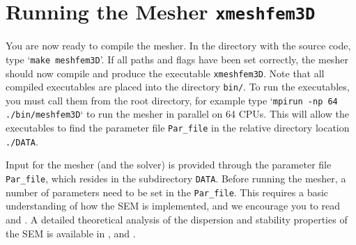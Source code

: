 \documentclass[oneside,english]{book}
\begin{document}
\chapter{\label{cha:Running-the-Mesher}Running the Mesher \texttt{xmeshfem3D}}

You are now ready to compile the mesher. In the directory with the
source code, type `\texttt{make meshfem3D}'. If all paths and flags
have been set correctly, the mesher should now compile and produce
the executable \texttt{xmeshfem3D}. 
Note that all compiled executables are placed into the directory \texttt{bin/}.
To run the executables, you must call them from the root directory,
for example type `\texttt{mpirun -np 64 ./bin/meshfem3D}` to run the mesher
in parallel on 64 CPUs. This will allow the executables to find the parameter file
\texttt{Par\_file} in the relative directory location \texttt{./DATA}.

Input for the mesher (and the solver) is provided through the parameter
file \texttt{Par\_file}, which resides in the subdirectory \texttt{DATA}.
Before running the mesher, a number of parameters need to be set in
the \texttt{Par\_file}. This requires a basic understanding of how
the SEM is implemented, and we encourage you to read \citet{KoVi98,KoTr99,Ch00,KoTr02a,KoTr02b,KoRiTr02,ChCaVi03,CaChViMo03}
and \citet{ChVa04}. A detailed theoretical analysis of the dispersion
and stability properties of the SEM is available in \citet{Coh02}, \citet{DeSe07}
and \citet{SeOl07}.
\end{document}
